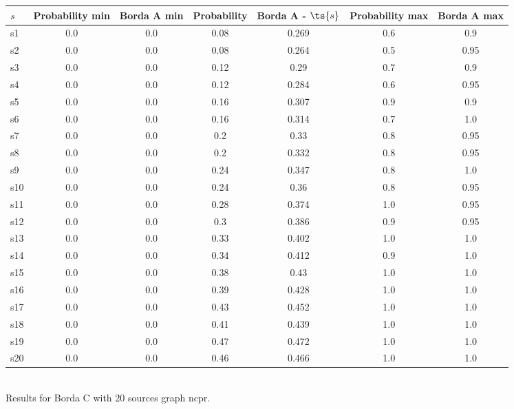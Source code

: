 \documentclass{article}
\begin{document}
\noindent\begin{tabular}{|l|c|c|c|c|c|c|}
\hline
$s$& Probability min & Borda A min & Probability & Borda A - $\ts{s}$ & Probability max & Borda A max\\
\hline
s1 &0.0 & 0.0 & 0.08 & 0.269 & 0.6 & 0.9\\
\hline
s2 &0.0 & 0.0 & 0.08 & 0.264 & 0.5 & 0.95\\
\hline
s3 &0.0 & 0.0 & 0.12 & 0.29 & 0.7 & 0.9\\
\hline
s4 &0.0 & 0.0 & 0.12 & 0.284 & 0.6 & 0.95\\
\hline
s5 &0.0 & 0.0 & 0.16 & 0.307 & 0.9 & 0.9\\
\hline
s6 &0.0 & 0.0 & 0.16 & 0.314 & 0.7 & 1.0\\
\hline
s7 &0.0 & 0.0 & 0.2 & 0.33 & 0.8 & 0.95\\
\hline
s8 &0.0 & 0.0 & 0.2 & 0.332 & 0.8 & 0.95\\
\hline
s9 &0.0 & 0.0 & 0.24 & 0.347 & 0.8 & 1.0\\
\hline
s10 &0.0 & 0.0 & 0.24 & 0.36 & 0.8 & 0.95\\
\hline
s11 &0.0 & 0.0 & 0.28 & 0.374 & 1.0 & 0.95\\
\hline
s12 &0.0 & 0.0 & 0.3 & 0.386 & 0.9 & 0.95\\
\hline
s13 &0.0 & 0.0 & 0.33 & 0.402 & 1.0 & 1.0\\
\hline
s14 &0.0 & 0.0 & 0.34 & 0.412 & 0.9 & 1.0\\
\hline
s15 &0.0 & 0.0 & 0.38 & 0.43 & 1.0 & 1.0\\
\hline
s16 &0.0 & 0.0 & 0.39 & 0.428 & 1.0 & 1.0\\
\hline
s17 &0.0 & 0.0 & 0.43 & 0.452 & 1.0 & 1.0\\
\hline
s18 &0.0 & 0.0 & 0.41 & 0.439 & 1.0 & 1.0\\
\hline
s19 &0.0 & 0.0 & 0.47 & 0.472 & 1.0 & 1.0\\
\hline
s20 &0.0 & 0.0 & 0.46 & 0.466 & 1.0 & 1.0\\
\hline
\end{tabular}\\

\noindent Results for Borda C with 20 sources graph ncpr.
\end{document}
